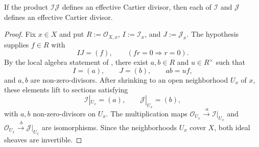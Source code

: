 \begin{lemma}
  \label{lemma:nagata-invertible-product-factor}

  If the product $\mathcal I\mathcal J$ defines an effective Cartier divisor,
  then each of $\mathcal I$ and $\mathcal J$ defines an effective Cartier
  divisor.
\end{lemma}

\begin{proof}
  Fix $x\in X$ and put
  $R:=\mathcal O_{X,x}$, $I:=\mathcal I_x$, and $J:=\mathcal J_x$.
  The hypothesis supplies $f\in R$ with
  \[
    IJ=(f),\qquad
    (f r=0\Longrightarrow r=0).
  \]
  By the local algebra statement of \cite[Tag 07ZV]{stacks-project}, there
  exist $a,b\in R$ and $u\in R^\times$ such that
  \[
    I=(a),\qquad J=(b),\qquad ab=uf,
  \]
  and $a,b$ are non-zero-divisors.  After shrinking to an open neighborhood
  $U_x$ of $x$, these elements lift to sections satisfying
  \[
    \mathcal I|_{U_x}=(a),\qquad
    \mathcal J|_{U_x}=(b),
  \]
  with $a,b$ non-zero-divisors on $U_x$.  The multiplication maps
  $\mathcal O_{U_x}\xrightarrow{\cdot a}\mathcal I|_{U_x}$ and
  $\mathcal O_{U_x}\xrightarrow{\cdot b}\mathcal J|_{U_x}$ are isomorphisms.
  Since the neighborhoods $U_x$ cover $X$, both ideal sheaves are invertible.
\end{proof}

